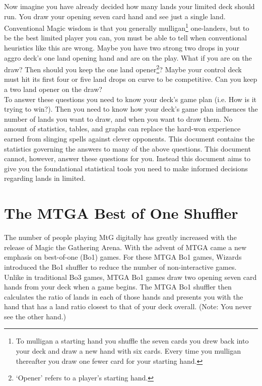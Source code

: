 \documentclass[oneside]{book}   %
\begin{document}
Now imagine you have already decided how many lands your limited deck should run. You draw your opening seven card hand and see just a single land. Conventional Magic wisdom is that you generally mulligan\footnote{To mulligan a starting hand you shuffle the seven cards you drew back into your deck and draw a new hand with six cards. Every time you mulligan thereafter you draw one fewer card for your starting hand.} one-landers, but to be the best limited player you can, you must be able to tell when conventional heuristics like this are wrong. Maybe you have two strong two drops in your aggro deck's one land opening hand and are on the play. What if you are on the draw? Then should you keep the one land opener\footnote{`Opener' refers to a player's starting hand.}? Maybe your control deck must hit its first four or five land drops on curve to be competitive. Can you keep a two land opener on the draw? \\

To answer these questions you need to know your deck's game plan (i.e. How is it trying to win?). Then you need to know how your deck's game plan influences the number of lands you want to draw, and when you want to draw them. No amount of statistics, tables, and graphs can replace the hard-won experience earned from slinging spells against clever opponents. This document contains the statistics governing the answers to many of the above questions. This document cannot, however, answer these questions for you. Instead this document aims to give you the foundational statistical tools you need to make informed decisions regarding lands in limited.

\section{The MTGA Best of One Shuffler}
\label{sec:computers_overview}

The number of people playing MtG digitally has greatly increased with the release of Magic the Gathering Arena. With the advent of MTGA came a new emphasis on best-of-one (Bo1) games. For these MTGA Bo1 games, Wizards introduced the Bo1 shuffler to reduce the number of non-interactive games. Unlike in traditional Bo3 games, MTGA Bo1 games draw two opening seven card hands from your deck when a game begins. The MTGA Bo1 shuffler then calculates the ratio of lands in each of those hands and presents you with the hand that has a land ratio closest to that of your deck overall. (Note: You never see the other hand.)\\
\end{document}

